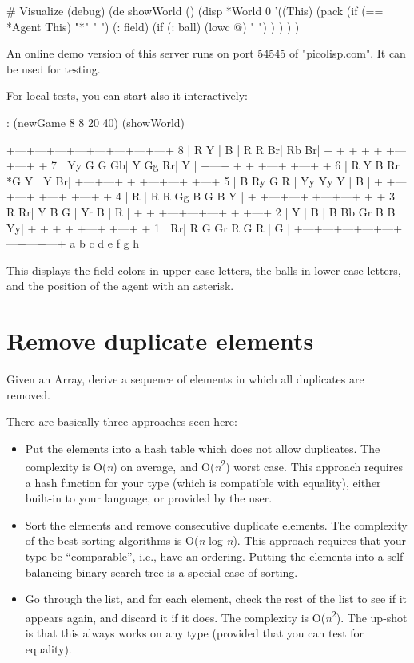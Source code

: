\begin{wideverbatim}

# Visualize (debug)
(de showWorld ()
   (disp *World 0
      '((This)
         (pack
            (if (== *Agent This) "*" " ")
            (: field)
            (if (: ball) (lowc @) " ") ) ) ) )

An online demo version of this server runs on port 54545 of "picolisp.com". It
can be used for testing.

For local tests, you can start also it interactively:

: (newGame 8 8 20 40) (showWorld)

   +---+---+---+---+---+---+---+---+
 8 | R   Y | B | R   R   Br| Rb  Br|
   +   +   +   +   +   +---+---+   +
 7 | Yy  G   G   Gb| Y   Gg  Rr| Y |
   +---+   +   +   +---+   +---+   +
 6 | R   Y   B   Rr *G   Y | Y   Br|
   +---+---+   +   +---+---+   +---+
 5 | B   Ry  G   R | Yy  Yy  Y | B |
   +   +---+---+   +---+   +---+   +
 4 | R | R   R   Gg  B   G   B   Y |
   +   +---+---+   +---+---+   +   +
 3 | R   Rr| Y   B   G | Yr  B | R |
   +   +   +---+---+---+   +   +---+
 2 | Y | B | B   Bb  Gr  B   B   Yy|
   +   +   +   +   +---+   +---+   +
 1 | Rr| R   G   Gr  R   G   R | G |
   +---+---+---+---+---+---+---+---+
     a   b   c   d   e   f   g   h

This displays the field colors in upper case letters, the balls in lower case
letters, and the position of the agent with an asterisk.

\end{wideverbatim}

\pagebreak{}
\section*{Remove duplicate elements}

Given an Array, derive a sequence of elements in which all duplicates
are removed.

There are basically three approaches seen here:

\begin{itemize}
\item
  Put the elements into a hash table which does not allow duplicates.
  The complexity is O(\emph{n}) on average, and
  O(\emph{n}\textsuperscript{2}) worst case. This approach requires a
  hash function for your type (which is compatible with equality),
  either built-in to your language, or provided by the user.
\item
  Sort the elements and remove consecutive duplicate elements. The
  complexity of the best sorting algorithms is O(\emph{n} log \emph{n}).
  This approach requires that your type be ``comparable'', i.e., have an
  ordering. Putting the elements into a self-balancing binary search
  tree is a special case of sorting.
\item
  Go through the list, and for each element, check the rest of the list
  to see if it appears again, and discard it if it does. The complexity
  is O(\emph{n}\textsuperscript{2}). The up-shot is that this always
  works on any type (provided that you can test for equality).
\end{itemize}

